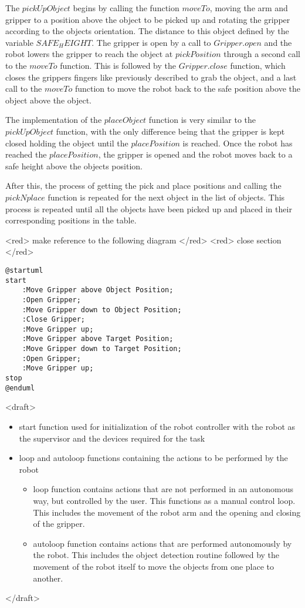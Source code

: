 The \(pickUpObject\) begins by calling the function \(moveTo\), moving the arm and gripper to a position above the object to be picked up and rotating the gripper according to the objects orientation. The distance to this object defined by the variable \(SAFE_HEIGHT\).
The gripper is open by a call to \(Gripper.open\) and the robot lowers the gripper to reach the object at \(pickPosition\) through a second call to the \(moveTo\) function.
This is followed by the \(Gripper.close\) function, which closes the grippers fingers like previously described to grab the object, and a last call to the \(moveTo\) function to move the robot back to the safe position above the object above the object.

The implementation of the \(placeObject\) function is very similar to the \(pickUpObject\) function, with the only difference being that the gripper is kept closed holding the object until the \(placePosition\) is reached. Once the robot has reached the \(placePosition\), the gripper is opened and the robot moves back to a safe height above the objects position.

After this, the process of getting the pick and place positions and calling the \(pickNplace\) function is repeated for the next object in the list of objects. This process is repeated until all the objects have been picked up and placed in their corresponding positions in the table.

<red> make reference to the following diagram </red>
<red> close section </red>

\begin{lstlisting}[]%language=plantuml
@startuml
start
    :Move Gripper above Object Position;
    :Open Gripper;
    :Move Gripper down to Object Position;
    :Close Gripper;
    :Move Gripper up;
    :Move Gripper above Target Position;
    :Move Gripper down to Target Position;
    :Open Gripper;
    :Move Gripper up;
stop
@enduml
\end{lstlisting}

<draft>

\begin{itemize}
    \item start function used for initialization of the robot controller with the robot as the supervisor and the devices required for the task
    \item loop and autoloop functions containing the actions to be performed by the robot
    \begin{itemize}
      \item loop function contains actions that are not performed in an autonomous way, but controlled by the user. This functions as a manual control loop. This includes the movement of the robot arm and the opening and closing of the gripper. 
      \item autoloop function contains actions that are performed autonomously by the robot. This includes the object detection routine followed by the movement of the robot itself to move the objects from one place to another.
    \end{itemize}
\end{itemize}
</draft>